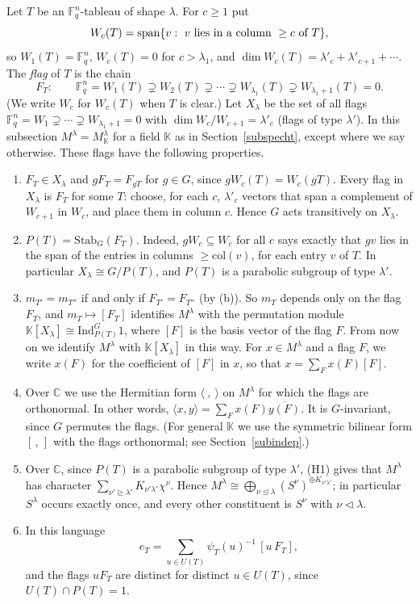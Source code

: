 \documentclass[11pt, letterpaper]{amsart}
\let\amstext\text
\renewcommand{\text}[1]{\amstext{\upshape #1}}%
\theoremstyle{definition}
\theoremstyle{remark}
\newcommand{\FF}{\mathbb{F}}
\newcommand{\KK}{\mathbb{K}}
\newcommand{\CC}{\mathbb{C}}
\newcommand{\col}{\mathrm{col}}
\newcommand{\Ind}{\mathrm{Ind}}
\newcommand{\domeq}{\trianglelefteq}
\begin{document}
Let $T$ be an $\FF_q^n$-tableau of shape $\lambda$. For $c\ge1$ put
\[
W_c(T)=\mathrm{span}\{v:\ v\ \text{lies in a column}\ \ge c\ \text{of}\ T\},
\]
so $W_1(T)=\FF_q^n$, $W_c(T)=0$ for $c>\lambda_1$, and $\dim W_c(T)=\lambda'_c+\lambda'_{c+1}+\cdots$. The \emph{flag} of $T$ is the chain
\[
F_T:\qquad \FF_q^n=W_1(T)\supsetneq W_2(T)\supsetneq\cdots\supsetneq W_{\lambda_1}(T)\supsetneq W_{\lambda_1+1}(T)=0.
\]
(We write $W_c$ for $W_c(T)$ when $T$ is clear.) Let $X_\lambda$ be the set of all flags $\FF_q^n=W_1\supsetneq\cdots\supsetneq W_{\lambda_1+1}=0$ with $\dim W_c/W_{c+1}=\lambda'_c$ (flags of type $\lambda'$). In this subsection $M^\lambda=M^\lambda_\KK$ for a field $\KK$ as in Section~\ref{subspecht}, except where we say otherwise. These flags have the following properties.
\begin{enumerate}
\item[(a)] $F_T\in X_\lambda$ and $gF_T=F_{gT}$ for $g\in G$, since $gW_c(T)=W_c(gT)$. Every flag in $X_\lambda$ is $F_T$ for some $T$: choose, for each $c$, $\lambda'_c$ vectors that span a complement of $W_{c+1}$ in $W_c$, and place them in column $c$. Hence $G$ acts transitively on $X_\lambda$.
\item[(b)] $P(T)=\mathrm{Stab}_G(F_T)$. Indeed, $gW_c\subseteq W_c$ for all $c$ says exactly that $gv$ lies in the span of the entries in columns $\ge\col(v)$, for each entry $v$ of $T$. In particular $X_\lambda\cong G/P(T)$, and $P(T)$ is a parabolic subgroup of type $\lambda'$.
\item[(c)] $m_{T'}=m_{T''}$ if and only if $F_{T'}=F_{T''}$ (by (b)). So $m_T$ depends only on the flag $F_T$, and $m_T\mapsto[F_T]$ identifies $M^\lambda$ with the permutation module $\KK[X_\lambda]\cong\Ind_{P(T)}^G1$, where $[F]$ is the basis vector of the flag $F$. From now on we identify $M^\lambda$ with $\KK[X_\lambda]$ in this way. For $x\in M^\lambda$ and a flag $F$, we write $x(F)$ for the coefficient of $[F]$ in $x$, so that $x=\sum_Fx(F)[F]$.
\item[(d)] Over $\CC$ we use the Hermitian form $\langle\ ,\ \rangle$ on $M^\lambda$ for which the flags are orthonormal. In other words, $\langle x,y\rangle=\sum_Fx(F)\overline{y(F)}$. It is $G$-invariant, since $G$ permutes the flags. (For general $\KK$ we use the symmetric bilinear form $[\,,\,]$ with the flags orthonormal; see Section~\ref{subindep}.)
\item[(e)] Over $\CC$, since $P(T)$ is a parabolic subgroup of type $\lambda'$, (H1) gives that $M^\lambda$ has character $\sum_{\nu'\trianglerighteq\lambda'}K_{\nu'\lambda'}\chi^\nu$. Hence $M^\lambda\cong\bigoplus_{\nu\domeq\lambda}(S^\nu)^{\oplus K_{\nu'\lambda'}}$; in particular $S^\lambda$ occurs exactly once, and every other constituent is $S^\nu$ with $\nu\lhd\lambda$.
\item[(f)] In this language
\[
e_T=\sum_{u\in U(T)}\psi_T(u)^{-1}\,[u\,F_T],
\]
and the flags $uF_T$ are distinct for distinct $u\in U(T)$, since $U(T)\cap P(T)=1$.
\end{enumerate}
\end{document}
